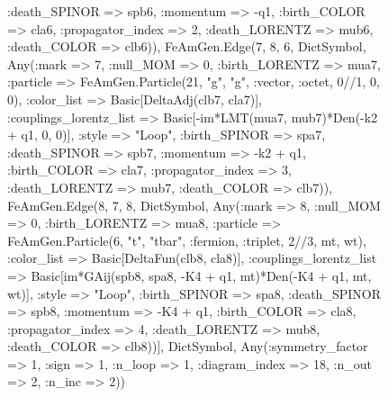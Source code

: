 \documentclass{revtex4}
\begin{document}
\begin{figure}[!htb]
\begin{center}
{:death_SPINOR => spb6, :momentum => -q1, :birth_COLOR => cla6, :propagator_index => 2, :death_LORENTZ => mub6, :death_COLOR => clb6)), FeAmGen.Edge(7, 8, 6, Dict{Symbol, Any}(:mark => 7, :null_MOM => 0, :birth_LORENTZ => mua7, :particle => FeAmGen.Particle(21, "g", "g", :vector, :octet, 0//1, 0, 0), :color_list => Basic[DeltaAdj(clb7, cla7)], :couplings_lorentz_list => Basic[-im*LMT(mua7, mub7)*Den(-k2 + q1, 0, 0)], :style => "Loop", :birth_SPINOR => spa7, :death_SPINOR => spb7, :momentum => -k2 + q1, :birth_COLOR => cla7, :propagator_index => 3, :death_LORENTZ => mub7, :death_COLOR => clb7)), FeAmGen.Edge(8, 7, 8, Dict{Symbol, Any}(:mark => 8, :null_MOM => 0, :birth_LORENTZ => mua8, :particle => FeAmGen.Particle(6, "t", "tbar", :fermion, :triplet, 2//3, mt, wt), :color_list => Basic[DeltaFun(clb8, cla8)], :couplings_lorentz_list => Basic[im*GAij(spb8, spa8, -K4 + q1, mt)*Den(-K4 + q1, mt, wt)], :style => "Loop", :birth_SPINOR => spa8, :death_SPINOR => spb8, :momentum => -K4 + q1, :birth_COLOR => cla8, :propagator_index => 4, :death_LORENTZ => mub8, :death_COLOR => clb8))], Dict{Symbol, Any}(:symmetry_factor => 1, :sign => 1, :n_loop => 1, :diagram_index => 18, :n_out => 2, :n_inc => 2)) 
}
\end{center}
\end{figure}
\end{document}
